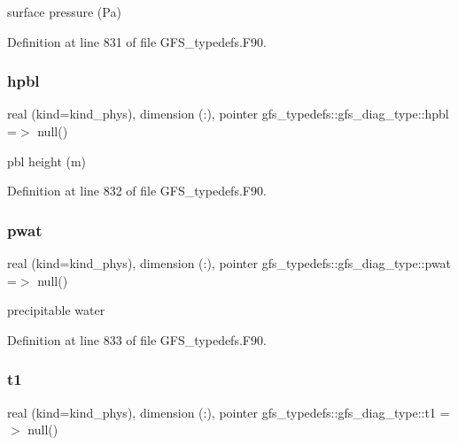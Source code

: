 surface pressure (Pa) 



Definition at line 831 of file G\+F\+S\+\_\+typedefs.\+F90.

\mbox{\label{structgfs__typedefs_1_1gfs__diag__type_a1c5e23e6703ba9bde3c2f7f061546f13}} 
\subsubsection{hpbl}
{\footnotesize\ttfamily real (kind=kind\+\_\+phys), dimension   (\+:), pointer gfs\+\_\+typedefs\+::gfs\+\_\+diag\+\_\+type\+::hpbl =$>$ null()}



pbl height (m) 



Definition at line 832 of file G\+F\+S\+\_\+typedefs.\+F90.

\mbox{\label{structgfs__typedefs_1_1gfs__diag__type_a1b0b0d4da17962ffbd2baead2b0932e4}} 
\subsubsection{pwat}
{\footnotesize\ttfamily real (kind=kind\+\_\+phys), dimension   (\+:), pointer gfs\+\_\+typedefs\+::gfs\+\_\+diag\+\_\+type\+::pwat =$>$ null()}



precipitable water 



Definition at line 833 of file G\+F\+S\+\_\+typedefs.\+F90.

\mbox{\label{structgfs__typedefs_1_1gfs__diag__type_aeacd443169ff762095c1c5e0f168dd3d}} 
\subsubsection{t1}
{\footnotesize\ttfamily real (kind=kind\+\_\+phys), dimension     (\+:), pointer gfs\+\_\+typedefs\+::gfs\+\_\+diag\+\_\+type\+::t1 =$>$ null()}



